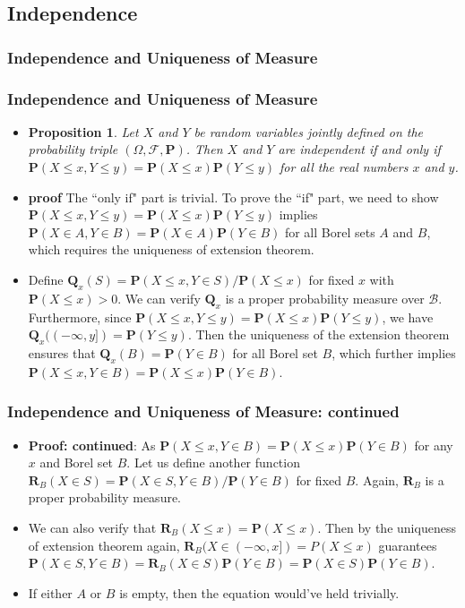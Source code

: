 \documentclass[handout]{beamer}
\newtheorem{Proposition}[theorem]{Proposition}%
\newcommand{\BP}{\mathbf{P}}
\begin{document}
\subsection{Independence}


\subsubsection{Independence and Uniqueness of Measure}
\frame
{
  \frametitle{Independence and Uniqueness of Measure}

   \begin{itemize}

\item<1->[]  
\begin{Proposition}
Let $X$ and $Y$ be random variables jointly defined on the probability triple $(\Omega, \mathcal{F}, \BP)$. Then $X$ and $Y$ are independent if and only if $\BP(X\leq x, Y\leq y)=\BP(X\leq x)\BP (Y\leq y)$ for all the real numbers $x$ and $y$.
\end{Proposition}
             
\item<2->  
\textbf{proof} The ``only if" part is trivial. To prove the ``if" part, we need to show $\BP(X\leq x, Y\leq y)=\BP(X\leq x)\BP (Y\leq y)$ implies $\BP(X\in A, Y\in B)=\BP(X\in A)\BP (Y\in B)$ for all Borel sets $A$ and $B$, which requires the uniqueness of extension theorem. 

\item<3->[-] 
Define $\mathbf{Q}_x(S)=\BP(X\leq x, Y\in S)/\BP(X\leq x)$ for fixed $x$ with $\BP(X\leq x)>0$. We can verify $\mathbf{Q}_x$ is a proper probability measure over $\mathcal{B}$. Furthermore, since $\BP(X\leq x, Y\leq y)=\BP(X\leq x)\BP (Y\leq y)$, we have $\mathbf{Q}_x((-\infty, y])=\mathbf{P}(Y\leq y)$. Then the uniqueness of the extension theorem ensures that $\mathbf{Q}_x(B)=\BP(Y\in B)$ for all Borel set $B$, which further implies $\BP(X\leq x, Y\in B)=\BP(X\leq x)\BP( Y\in B)$. 
                           
\end{itemize}
}


\frame
{
  \frametitle{Independence and Uniqueness of Measure: continued}

   \begin{itemize}

\item<1->  
\textbf{Proof: continued}: As  $\BP(X\leq x, Y\in B)=\BP(X\leq x)\BP( Y\in B)$ for any $x$ and Borel set $B$. Let us define another function $\mathbf{R}_B (X\in S)=\BP(X\in S, Y\in B)/\BP(Y\in B)$ for fixed $B$. Again, $\mathbf{R}_B$ is a proper probability measure. 

\item<2->  We can also verify that $\mathbf{R}_B (X\leq x)=\BP(X\leq x)$. Then by the uniqueness of extension theorem again, $\mathbf{R}_B(X \in (-\infty,x]) = P(X \le x)$ guarantees $\BP(X\in S, Y\in B)=\mathbf{R}_B (X\in S)\BP(Y\in B)=\BP(X\in S)\BP(Y\in B)$.


\item<3-> If either $A$ or $B$ is empty, then the equation would've held trivially.
\end{itemize}
}
\end{document}
